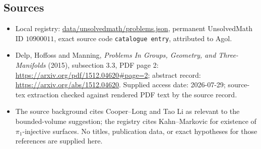 \documentclass[11pt]{article}
\begin{document}
\subsection{Sources}
\begin{itemize}
\item Local registry: \url{data/unsolvedmath/problems.json}, permanent UnsolvedMath ID $10900011$, exact source code \texttt{catalogue entry}, attributed to Agol.
\item Delp, Hoffoss and Manning, \emph{Problems In Groups, Geometry, and Three-Manifolds} (2015), subsection 3.3, PDF page 2: \url{https://arxiv.org/pdf/1512.04620#page=2}; abstract record: \url{https://arxiv.org/abs/1512.04620}. Supplied access date: 2026-07-29; source-tex extraction checked against rendered PDF text by the source record.
\item The source background cites Cooper--Long and Tao Li as relevant to the bounded-volume suggestion; the registry cites Kahn--Markovic for existence of $\pi_1$-injective surfaces. No titles, publication data, or exact hypotheses for those references are supplied here.
\end{itemize}
\end{document}
